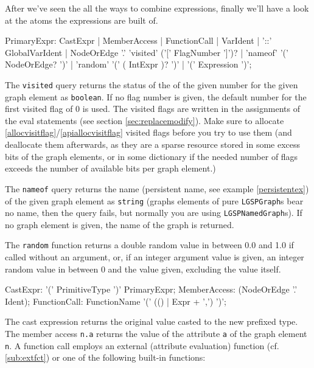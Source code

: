 After we've seen the all the ways to combine expressions, finally we'll have a look at the atoms the expressions are built of.

\begin{rail}
  PrimaryExpr: CastExpr
  		| MemberAccess
  		| FunctionCall
  		| VarIdent
  		| '::' GlobalVarIdent
  		| NodeOrEdge '.' 'visited' ('[' FlagNumber ']')?
  		| 'nameof' '(' NodeOrEdge? ')'
  		| 'random' '(' ( IntExpr )? ')'
  		| '(' Expression ')';
\end{rail}

The \texttt{visited} query returns the status of the  of the given number for the given graph element as \texttt{boolean}.
If no flag number is given, the default number for the first visited flag of 0 is used.
The visited flags are written in the assignments of the eval statements (see section \ref{sec:replacemodify}).
Make sure to allocate \ref{allocvisitflag}/\ref{apiallocvisitflag} visited flags before you try to use them
(and deallocate them afterwards, as they are a sparse resource stored in some excess bits of the graph elements, or in some dictionary if the needed number of flags exceeds the number of available bits per graph element.)

The \texttt{nameof} query returns the name (persistent name, see example \ref{persistentex}) of the given graph element as \texttt{string}
(graphs elements of pure \texttt{LGSPGraph}s bear no name, then the query fails, but normally you are using \texttt{LGSPNamedGraph}s).
If no graph element is given, the name of the graph is returned.

The \texttt{random} function returns a double random value in between 0.0 and 1.0 if called without an argument,
or, if an integer argument value is given, an integer random value in between 0 and the value given, excluding the value itself.

\begin{rail}
  CastExpr: '(' PrimitiveType ')' PrimaryExpr;
  MemberAccess: (NodeOrEdge '.' Ident);
  FunctionCall: FunctionName '(' (() | Expr + ',') ')';
\end{rail}

The cast expression returns the original value casted to the new prefixed type.
The member access \texttt{n.a} returns the value of the attribute \texttt{a} of the graph element \texttt{n}.
A function call employs an external (attribute evaluation) function (cf. \ref{sub:extfct}) or one of the following built-in functions:


